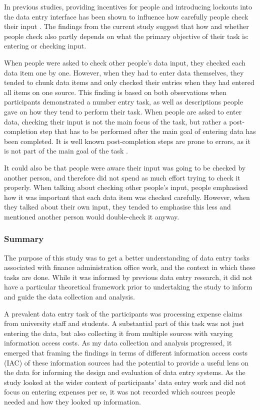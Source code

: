 \documentclass[11pt,oneside]{report}
\begin{document}
In previous studies, providing incentives for people and introducing lockouts into the data entry interface has been shown to influence how carefully people check their input \citep{Li2015, Gould2015}. The findings from the current study suggest that how and whether people check also partly depends on what the primary objective of their task is: entering or checking input.

When people were asked to check other people's data input, they checked each data item one by one. However, when they had to enter data themselves, they tended to chunk data items and only checked their entries when they had entered all items on one source. This finding is based on both observations when participants demonstrated a number entry task, as well as descriptions people gave on how they tend to perform their task. When people are asked to enter data, checking their input is not the main focus of the task, but rather a post-completion step that has to be performed after the main goal of entering data has been completed. It is well known post-completion steps are prone to errors, as it is not part of the main goal of the task \citep[e.g.][]{Byrne1995, Li2006, Li2008}.

It could also be that people were aware their input was going to be checked by another person, and therefore did not spend as much effort trying to check it properly. When talking about checking other people's input, people emphasised how it was important that each data item was checked carefully. However, when they talked about their own input, they tended to emphasise this less and mentioned another person would double-check it anyway.

\subsubsection{Summary}
The purpose of this study was to get a better understanding of data entry tasks associated with finance administration office work, and the context in which these tasks are done. While it was informed by previous data entry research, it did not have a particular theoretical framework prior to undertaking the study to inform and guide the data collection and analysis. 

A prevalent data entry task of the participants was processing expense claims from university staff and students. A substantial part of this task was not just entering the data, but also collecting it from multiple sources with varying information access costs. As my data collection and analysis progressed, it emerged that framing the findings in terms of different information access costs (IAC) of these information sources had the potential to provide a useful lens on the data for informing the design and evaluation of data entry systems. As the study looked at the wider context of participants' data entry work and did not focus on entering expenses per se, it was not recorded which sources people needed and how they looked up information.
\end{document}
